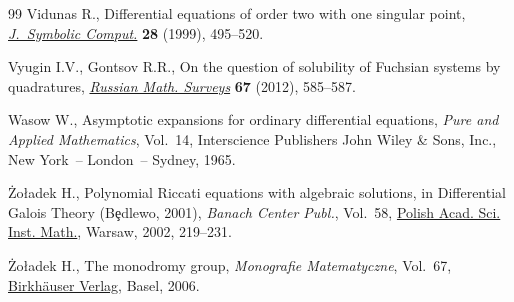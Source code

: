 \documentclass[pdftex]{sigma}
\numberwithin{equation}{section}
\begin{document}
\begin{thebibliography}{99}
Vidunas R., Differential equations of order two with one singular point,
 \href{https://doi.org/10.1006/jsco.1999.0312}{\textit{J.~Symbolic Comput.}} \textbf{28} (1999), 495--520.

Vyugin I.V., Gontsov R.R., On the question of solubility of {F}uchsian systems
 by quadratures, \href{https://doi.org/10.1070/RM2012v067n03ABEH004801}{\textit{Russian Math. Surveys}} \textbf{67} (2012), 585--587.

Wasow W., Asymptotic expansions for ordinary differential equations,
 \textit{Pure and Applied Mathematics}, Vol.~14, Interscience Publishers John
 Wiley \& Sons, Inc., New York~-- London~-- Sydney, 1965.

\.{Z}o{\l}adek H., Polynomial {R}iccati equations with algebraic solutions, in
 Differential {G}alois Theory ({B}\c{e}dlewo, 2001), \textit{Banach Center
 Publ.}, Vol.~58, \href{https://doi.org/10.4064/bc58-0-17}{Polish Acad. Sci. Inst. Math.}, Warsaw, 2002, 219--231.

\.{Z}o{\l}adek H., The monodromy group, \textit{Monografie Matematyczne},
 Vol.~67, \href{https://doi.org/10.1007/3-7643-7536-1}{Birkh\"{a}user Verlag}, Basel, 2006.

\end{thebibliography}\LastPageEnding
\end{document}
